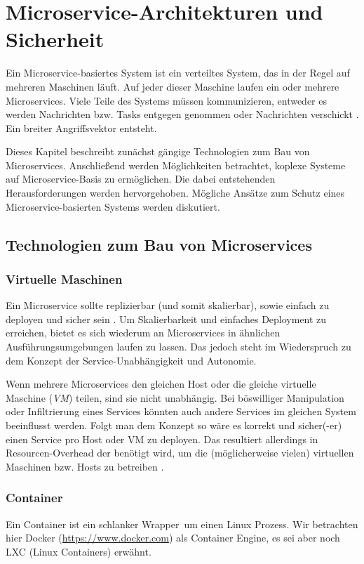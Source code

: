 \section{Microservice-Architekturen und Sicherheit}

Ein Microservice-basiertes System ist ein verteiltes System, das in der Regel auf mehreren Maschinen läuft. Auf jeder dieser Maschine laufen ein oder mehrere Microservices. Viele Teile des Systems müssen kommunizieren, entweder es werden Nachrichten bzw. Tasks entgegen genommen oder Nachrichten verschickt \cite{newman2015}. Ein breiter Angriffsvektor entsteht.

Dieses Kapitel beschreibt zunächst gängige Technologien zum Bau von Microservices. Anschließend werden Möglichkeiten betrachtet, koplexe Systeme auf Microservice-Basis zu ermöglichen. Die dabei entstehenden Herausforderungen werden hervorgehoben. Mögliche Ansätze zum Schutz eines Microservice-basierten Systems werden diskutiert.


\subsection{Technologien zum Bau von Microservices}

\subsubsection{Virtuelle Maschinen}

Ein Microservice sollte replizierbar (und somit skalierbar), sowie einfach zu deployen und sicher sein \cite{newman2015,microservicesIO}. Um Skalierbarkeit und einfaches Deployment zu erreichen, bietet es sich wiederum an Microservices in ähnlichen Ausführungsumgebungen laufen zu lassen. Das jedoch steht im Wiederspruch zu dem Konzept der Service-Unabhängigkeit und Autonomie. 

Wenn mehrere Microservices den gleichen Host oder die gleiche virtuelle Maschine (\textit{VM}) teilen, sind sie nicht unabhängig. Bei böswilliger Manipulation oder Infiltrierung eines Services könnten auch andere Services im gleichen System beeinflusst werden. Folgt man dem Konzept so wäre es korrekt und sicher(-er) einen Service pro Host oder VM zu deployen. Das resultiert allerdings in Resourcen-Overhead der benötigt wird, um die (möglicherweise vielen) virtuellen Maschinen bzw. Hosts zu betreiben \cite{microservicesIO}.

\subsubsection{Container}
Ein Container ist ein schlanker \glqq Wrapper\grqq\ um einen Linux Prozess. Wir betrachten hier Docker (\url{https://www.docker.com}) als Container Engine, es sei aber noch LXC (Linux Containers) erwähnt.

